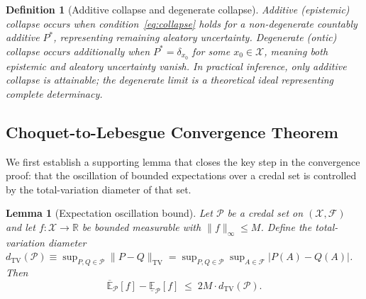\documentclass[12pt]{article}
\newtheorem{lemma}[theorem]{Lemma}
\newtheorem{definition}[theorem]{Definition}
\newcommand{\calF}{\mathcal{F}}
\newcommand{\calX}{\mathcal{X}}
\newcommand{\R}{\mathbb{R}}
\newcommand{\E}{\mathbb{E}}
\begin{document}
\begin{definition}[Additive collapse and degenerate collapse]
\label{def:collapse_types}
\emph{Additive (epistemic) collapse} occurs when condition~\eqref{eq:collapse}
holds for a non-degenerate countably additive $P^*$, representing remaining
aleatory uncertainty.
\emph{Degenerate (ontic) collapse} occurs additionally when $P^*=\delta_{x_0}$
for some $x_0\in\calX$, meaning both epistemic and aleatory uncertainty vanish.
In practical inference, only additive collapse is attainable; the degenerate limit
is a theoretical ideal representing complete determinacy.
\end{definition}

\subsection{Choquet-to-Lebesgue Convergence Theorem}

We first establish a supporting lemma that closes the key step in the
convergence proof: that the oscillation of bounded expectations over a
credal set is controlled by the total-variation diameter of that set.

\begin{lemma}[Expectation oscillation bound]
\label{lem:oscillation}
Let $\mathcal{P}$ be a credal set on $(\calX,\calF)$ and let
$f:\calX\to\R$ be bounded measurable with $\|f\|_\infty\le M$.
Define the total-variation diameter
$d_{\mathrm{TV}}(\mathcal{P}) \equiv \sup_{P,Q\in\mathcal{P}}\|P-Q\|_{\mathrm{TV}}
= \sup_{P,Q\in\mathcal{P}}\sup_{A\in\calF}|P(A)-Q(A)|$.
Then
\begin{equation}
\overline{\E}_\mathcal{P}[f] - \underline{\E}_\mathcal{P}[f]
\;\le\; 2M\cdot d_{\mathrm{TV}}(\mathcal{P}).
\label{eq:oscillation}
\end{equation}
\end{lemma}
\end{document}
